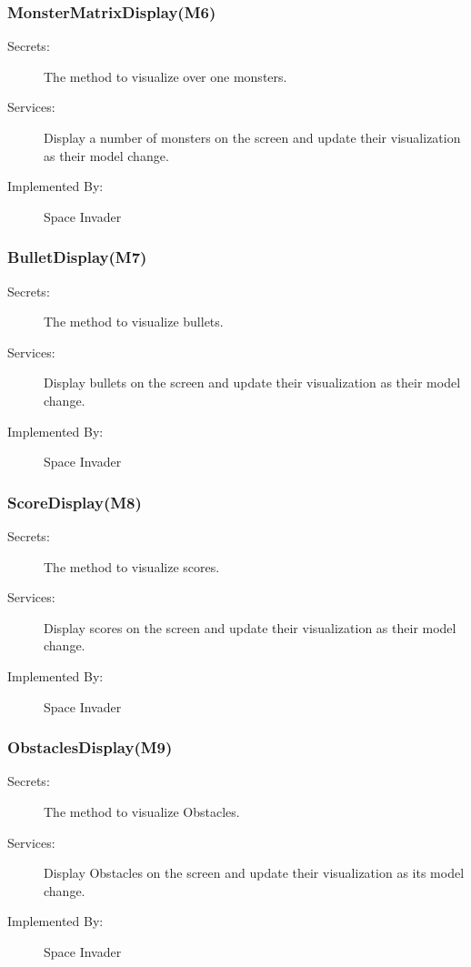 \documentclass[12pt]{article}
\begin{document}
\subsubsection{MonsterMatrixDisplay(M6)}
\begin{description}
\item[Secrets:] The method to visualize over one monsters.
\item[Services:] Display a number of monsters on the screen and update their visualization as their model change.
\item[Implemented By:] Space Invader
\end{description}

\subsubsection{BulletDisplay(M7)}
\begin{description}
\item[Secrets:] The method to visualize bullets.
\item[Services:] Display bullets on the screen and update their visualization as their model change.
\item[Implemented By:] Space Invader
\end{description}

\subsubsection{ScoreDisplay(M8)}
\begin{description}
\item[Secrets:] The method to visualize scores.
\item[Services:] Display scores on the screen and update their visualization as their model change.
\item[Implemented By:] Space Invader
\end{description}

\subsubsection{ObstaclesDisplay(M9)}
\begin{description}
\item[Secrets:] The method to visualize Obstacles.
\item[Services:] Display Obstacles on the screen and update their visualization as its model change.
\item[Implemented By:] Space Invader
\end{description}
\end{document}
